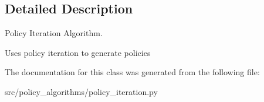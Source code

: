 \subsection{Detailed Description}
Policy Iteration Algorithm. 

Uses policy iteration to generate policies 

The documentation for this class was generated from the following file\+:\begin{DoxyCompactItemize}
\item 
src/policy\+\_\+algorithms/policy\+\_\+iteration.\+py\end{DoxyCompactItemize}
